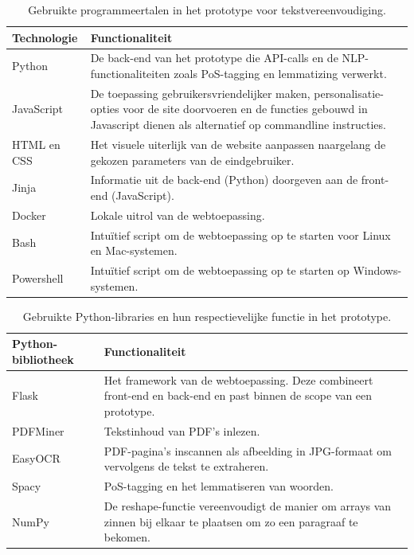 \begin{center}
	\begin{table}[H]
	\begin{tabular}{ | m{4cm} | m{12cm} | } 
		\hline
		\textbf{Technologie} & \textbf{Functionaliteit} \\
		\hline
		Python & De back-end van het prototype die API-calls en de NLP-functionaliteiten zoals PoS-tagging en lemmatizing verwerkt. \\
		\hline
		JavaScript & De toepassing gebruikersvriendelijker maken, personalisatie-opties voor de site doorvoeren en de functies gebouwd in Javascript dienen als alternatief op commandline instructies. \\
		\hline
		HTML en CSS & Het visuele uiterlijk van de website aanpassen naargelang de gekozen parameters van de eindgebruiker. \\
		\hline
		Jinja & Informatie uit de back-end (Python) doorgeven aan de front-end (JavaScript).  \\
		\hline
		Docker & Lokale uitrol van de webtoepassing. \\
		\hline
		Bash & Intuïtief script om de webtoepassing op te starten voor Linux en Mac-systemen. \\
		\hline
		Powershell & Intuïtief script om de webtoepassing op te starten op Windows-systemen. \\
		\hline
	\end{tabular}
	\label{table:technologies}
	\caption{Gebruikte programmeertalen in het prototype voor tekstvereenvoudiging.}
	\end{table}
\end{center}

\begin{center}
	\begin{table}[H]
	\begin{tabular}{ | m{4cm} | m{12cm} | } 
		\hline
		\textbf{Python-bibliotheek} & \textbf{Functionaliteit} \\
		\hline
		Flask					& Het framework van de webtoepassing. Deze combineert front-end en back-end en past binnen de scope van een prototype. \\ %
		\hline
		PDFMiner 				& Tekstinhoud van PDF's inlezen. \\ 
		\hline
		EasyOCR					& PDF-pagina's inscannen als afbeelding in JPG-formaat om vervolgens de tekst te extraheren. \\
		\hline
		Spacy 					& PoS-tagging en het lemmatiseren van woorden. \\
		\hline
		NumPy 					& De reshape-functie vereenvoudigt de manier om arrays van zinnen bij elkaar te plaatsen om zo een paragraaf te bekomen. \\
		\hline
	\end{tabular}
	\label{table:python-libraries}
	\caption{Gebruikte Python-libraries en hun respectievelijke functie in het prototype.}
	\end{table}
\end{center}

